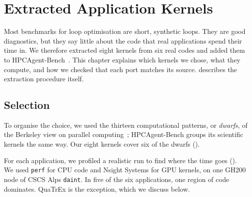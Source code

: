 \chapter{Extracted Application Kernels}
\label{ch:extracted}

Most benchmarks for loop optimisation are short, synthetic loops. They are good diagnostics,
but they say little about the code that real applications spend their time in. We therefore
extracted eight kernels from six real codes and added them to
HPCAgent-Bench~\cite{hpcagentbench}. This chapter explains which kernels we chose, what they
compute, and how we checked that each port matches its source.  describes the
extraction procedure itself.

\section{Selection}
\label{sec:extracted-selection}

To organise the choice, we used the thirteen computational patterns, or \emph{dwarfs}, of the
Berkeley view on parallel computing~\cite{asanovic2006landscape}; HPCAgent-Bench groups its
scientific kernels the same way. Our eight kernels cover six of the dwarfs
().

For each application, we profiled a realistic run to find where the time goes
(). We used \texttt{perf} for CPU code and Nsight Systems for GPU kernels, on
one GH200 node of CSCS Alps \texttt{daint}. In five of the six applications, one region of
code dominates. QuaTrEx is the exception, which we discuss below.

